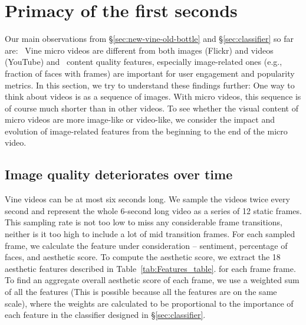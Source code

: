\section{Primacy of the first seconds}

Our main observations from \S\ref{sec:new-vine-old-bottle} and \S\ref{sec:classifier} so far are: \one\ Vine micro videos are different from both images (Flickr) and videos (YouTube) and \two\  content quality features, especially image-related ones (e.g., fraction of faces with frames) are  important for user engagement and popularity metrics. %
In this section, we try to understand these findings further: One way to think about videos is as a sequence of images. With micro videos, this sequence is of course much shorter than in other videos. To see whether the visual content of micro videos are more image-like or video-like, we consider the impact and evolution of image-related features from the beginning to the end of the micro video. 

\subsection{Image quality deteriorates over time}




Vine videos can be at most six seconds long. We sample the videos twice every second and represent the whole 6-second long video as a series of 12 static frames. This sampling rate is not too low to miss any considerable frame transitions, neither is it too high to include a lot of mid transition frames. For each sampled frame, we calculate the feature under consideration -- sentiment, percentage of faces, and aesthetic score. To compute the aesthetic score, we extract the 18 aesthetic features described in Table~\ref{tab:Features_table}. for each frame frame. To find an aggregate overall aesthetic score of each frame, we use a weighted sum of all the features (This is possible because all the features are on the same scale), where the weights are calculated to be proportional to the importance of each feature in the classifier designed in \S\ref{sec:classifier}. 


